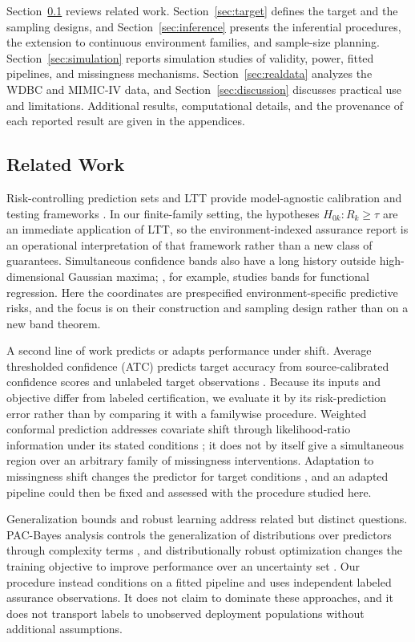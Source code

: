 \documentclass[twoside,11pt]{article}
\begin{document}
Section~\ref{sec:related} reviews related work. Section~\ref{sec:target} defines the target and
the sampling designs, and Section~\ref{sec:inference} presents the inferential procedures,
the extension to continuous environment families, and sample-size planning.
Section~\ref{sec:simulation} reports simulation studies of validity, power, fitted pipelines,
and missingness mechanisms. Section~\ref{sec:realdata} analyzes the WDBC and MIMIC-IV data,
and Section~\ref{sec:discussion} discusses practical use and limitations. Additional results,
computational details, and the provenance of each reported result are given in the appendices.

\subsection{Related Work}
\label{sec:related}
Risk-controlling prediction sets and LTT provide model-agnostic calibration and testing
frameworks \citep{bates2021rcps,angelopoulos2025ltt}. In our finite-family setting, the
hypotheses $H_{0k}:R_k\geq\tau$ are an immediate application of LTT, so the
environment-indexed assurance report is an operational interpretation of that framework
rather than a new class of guarantees. Simultaneous confidence bands also have a long history
outside high-dimensional Gaussian maxima; \citet{degras2011}, for example, studies bands for
functional regression. Here the coordinates are prespecified environment-specific predictive
risks, and the focus is on their construction and sampling design rather than on a new band
theorem.

A second line of work predicts or adapts performance under shift. Average thresholded
confidence (ATC) predicts target accuracy from source-calibrated confidence scores and
unlabeled target observations \citep{garg2022ood}. Because its inputs and objective differ
from labeled certification, we evaluate it by its risk-prediction error rather than by
comparing it with a familywise procedure. Weighted conformal prediction addresses covariate
shift through likelihood-ratio information under its stated conditions
\citep{tibshirani2019weighted}; it does not by itself give a simultaneous region over an
arbitrary family of missingness interventions. Adaptation to missingness shift changes the
predictor for target conditions \citep{zhou2023dams}, and an adapted pipeline could then be
fixed and assessed with the procedure studied here.

Generalization bounds and robust learning address related but distinct questions. PAC-Bayes
analysis controls the generalization of distributions over predictors through complexity
terms \citep{alquier2024}, and distributionally robust optimization changes the training
objective to improve performance over an uncertainty set \citep{duchi2021dro}. Our procedure
instead conditions on a fitted pipeline and uses independent labeled assurance observations.
It does not claim to dominate these approaches, and it does not transport labels to
unobserved deployment populations without additional assumptions.
\end{document}
